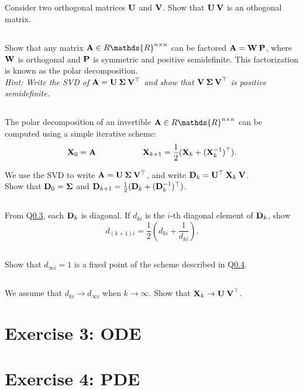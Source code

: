 \subsection{} Consider two orthogonal matrices ${\bf U}$ and ${\bf V}$. Show that ${\bf U\:V}$ is an othogonal matrix.

\subsection{} Show that any matrix  ${\bf A} \in R\mathds{R}^{n \times n}$ can be factored ${\bf A} = {\bf W\:P}$, where  ${\bf W}$ is orthogonal and  ${\bf P}$ is symmetric and positive semidefinite. This factorization is known as the polar decomposition.\\
\textit{Hint: Write the SVD of ${\bf A} = {\bf U \: \Sigma \: V^\top}$ and show that ${\bf V \: \Sigma \: V}^\top$ is positive semidefinite.}

\subsection{}\label{scheme} The polar decomposition of an invertible ${\bf A} \in R\mathds{R}^{n \times n}$ can be computed using a simple iterative scheme:
$$ {\bf X}_0 = {\bf A} \text{\hspace{2cm}} {\bf X}_{k+1} = \frac{1}{2}({\bf X}_k + ({\bf X}_k^{-1})^\top).$$

We use the SVD to write ${\bf A} = {\bf U \: \Sigma \: V^\top}$, and write  ${\bf D}_k = {\bf U}^\top \: {\bf X}_k \: {\bf V}$.\\ Show that ${\bf D}_0 = {\bf \Sigma}$ and ${\bf D}_{k+1} = \frac{1}{2}({\bf D}_k + ({\bf D}_k^{-1})^\top)$.

\subsection{}\label{scheme_diag} From Q\ref{scheme}, each ${\bf D}_k$ is diagonal. If $d_{ki}$ is the $i$-th diagonal element of ${\bf D}_k$, show
$$ d_{(k+1)i} = \frac{1}{2} \left(d_{ki} + \frac{1}{d_{ki}}\right). $$


\subsection{}\label{conv} Show that $d_{\infty i} = 1$ is a fixed point of the scheme described in Q\ref{scheme_diag}.

\subsection{} We assume that $d_{ki} \to d_{\infty i}$ when $k \to \infty$. Show that ${\bf X}_k \to {\bf U \: V}^\top$.

\section{Exercise 3: ODE}

\section{Exercise 4: PDE}
